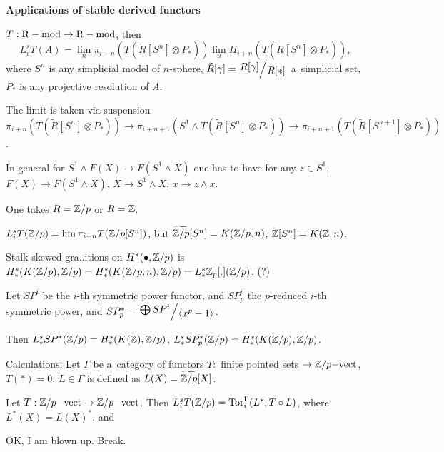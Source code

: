 



    {\bf Applications of stable derived functors}
    
    \begin{theorem}
        $T:\mathrm{R-mod} \to \mathrm{R-mod}$, then 
        $$L_i^sT(A) = \lim_n \pi_{i+n}(T(\tilde{R}[S^n] \otimes P_\ast))
        \lim_n H_{i+n}(T(\tilde{R}[S^n] \otimes P_\ast)),$$
        where $S^n$ is any simplicial model of $n$-sphere,
        $\tilde{R}[\gamma] = \bigslant{R[\gamma]}{R[\ast]}$ a~simplicial set,
        $P_\ast$ is any projective resolution of $A$.
        
        The limit is taken via suspension
        \\ $\pi_{i+n}(T(\tilde{R}[S^n] \otimes P_\ast)) 
        \to \pi_{i+n+1}(S^1 \wedge T(\tilde{R}[S^n] \otimes P_\ast))
        \to \pi_{i+n+1}(T(\tilde{R}[S^{n+1}] \otimes P_\ast))$.
    \end{theorem}
        
    In general for $S^1 \wedge F(X) \to F(S^1 \wedge X)$
    one has to have for any $z \in S^1$,
    ${F(X) \to F(S^1 \wedge X)}$, $X \to S^1 \wedge X$, $x \to z \wedge x$.
    
    One takes $R = {\mathbb{Z}} / p$ or $R = {\mathbb{Z}}$.
    
    $L_i^sT({\mathbb{Z}}/p) = \lim \pi_{i+n} T({\mathbb{Z}}/p [S^n])$,
    but $\widetilde{{\mathbb{Z}}/p}[S^n] = K({\mathbb{Z}}/p,n)$,
    $\tilde{{\mathbb{Z}}}[S^n] = K({\mathbb{Z}}, n)$.
    
    Stalk skewed gra..itions on $H^\ast(\bullet, {\mathbb{Z}}/p)$
    is \\$H_\ast^s(K({\mathbb{Z}}/p),{\mathbb{Z}}/p) 
    = H_\ast^s(K({\mathbb{Z}}/p,n),{\mathbb{Z}}/p)
    = L_\ast^s {\mathbb{Z}}_p[.]({\mathbb{Z}}/p)$. (?)
    
    \begin{theorem}
        Let $SP^i$ be the $i$-th symmetric power functor,
        and $SP^i_p$ the $p$-reduced $i$-th symmetric power,
        and $SP^\ast_p = \bigslant{\bigoplus SP^i}{\langle x^p - 1 \rangle}$.
        
        Then $L_\ast^s SP^\ast({\mathbb{Z}}/p) = H_\ast^s(K({\mathbb{Z}}),{\mathbb{Z}}/p)$,
        $L_\ast^s SP_p^\ast({\mathbb{Z}}/p) = H_\ast^s(K({\mathbb{Z}}/p),{\mathbb{Z}}/p)$.
    \end{theorem}
    
    Calculations: Let $\Gamma$ be a~category of functors 
    $T:$ finite pointed sets $\to {\mathbb{Z}}/p{\mathrm{-vect}}$,
    \\$T(\ast)=0$. 
    $L \in \Gamma$ is defined as $L(X) = \widetilde{{\mathbb{Z}}/p}[X]$.
    
    \begin{lemma}
        Let $T:{\mathbb{Z}}/p{\mathrm{-vect}} \to {\mathbb{Z}}/p{\mathrm{-vect}}$.
        Then $L_i^sT({\mathbb{Z}}/p) = \operatorname{Tor}_i^\Gamma(L^\ast,T\circ L)$,
        where $L^\ast(X) = L(X)^\ast$, and
    \end{lemma}
    
    OK, I am blown up. Break.




 
 